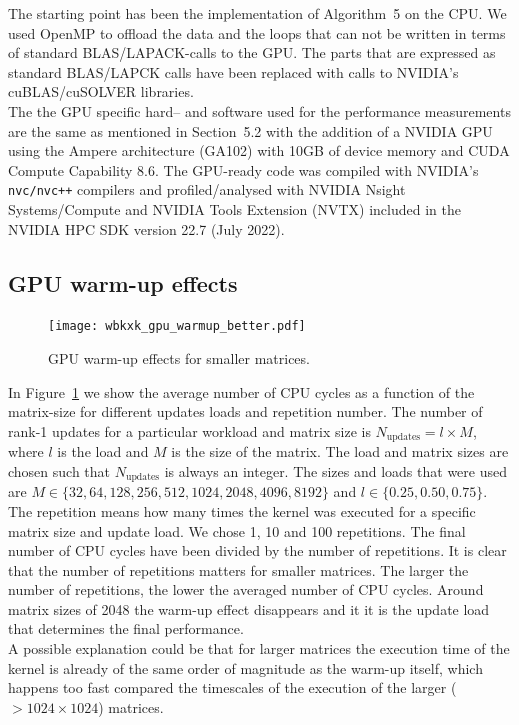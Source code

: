 \documentclass[11pt]{article}
\numberwithin{figure}{section}
\numberwithin{table}{section}
\begin{document}
    The starting point has been the implementation of Algorithm~5 on the CPU. We used OpenMP to offload the data and the loops that can not be written in terms of standard BLAS/LAPACK-calls to the GPU. The parts that are expressed as standard BLAS/LAPCK calls have been replaced with calls to NVIDIA's cuBLAS/cuSOLVER libraries.\\
    
    The the GPU specific hard-- and software used for the performance measurements are the same as mentioned in Section~5.2 with the addition of a NVIDIA GPU using the Ampere architecture (GA102) with 10GB of device memory and CUDA Compute Capability 8.6. The GPU-ready code was compiled with NVIDIA's \texttt{nvc/nvc++} compilers and profiled/analysed with NVIDIA Nsight Systems/Compute and NVIDIA Tools Extension (NVTX) included in the NVIDIA HPC SDK version 22.7 (July 2022).
  
    \subsection{GPU warm-up effects}
      \begin{figure}
        \centering
        \texttt{[image: wbkxk\_gpu\_warmup\_better.pdf]}
        \caption{GPU warm-up effects for smaller matrices.}
        \label{fig:gpu-warmup}
      \end{figure}
     In Figure~\ref{fig:gpu-warmup} we show the average number of CPU cycles as a function of the matrix-size for different updates loads and repetition number. The number of rank-1 updates for a particular workload and matrix size is $N_\text{updates}=l\times M$, where $l$ is the load and $M$ is the size of the matrix. The load and matrix sizes are chosen such that $N_\text{updates}$ is always an integer. The sizes and loads that were used are $M\in\{32,64,128,256,512,1024,2048,4096,8192\}$ and $l\in\{0.25,0.50,0.75\}$. The repetition means how many times the kernel was executed for a specific matrix size and update load. We chose 1, 10 and 100 repetitions. The final number of CPU cycles have been divided by the number of repetitions.
     It is clear that the number of repetitions matters for smaller matrices. The larger the number of repetitions, the lower the averaged number of CPU cycles. Around matrix sizes of 2048 the warm-up effect disappears and it it is the update load that determines the final performance.\\
     
     A possible explanation could be that for larger matrices the execution time of the kernel is already of the same order of magnitude as the warm-up itself, which happens too fast compared the timescales of the execution of the larger ($>1024\times1024$) matrices. 
\end{document}
